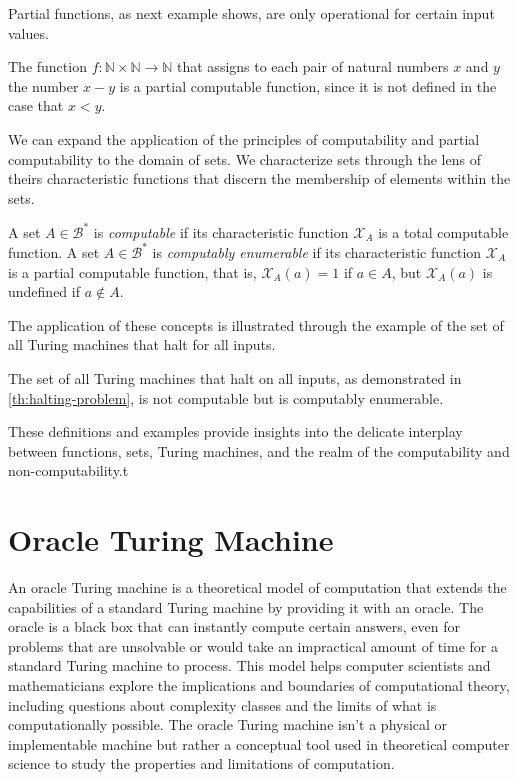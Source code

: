 Partial functions, as next example shows, are only operational for certain input values. 

\begin{example}
The function $f: \mathbb{N} \times \mathbb{N} \rightarrow \mathbb{N}$ that assigns to each pair of natural numbers $x$ and $y$ the number $x - y$ is a partial computable function, since it is not defined in the case that $x < y$.
\end{example}

We can expand the application of the principles of computability and partial computability to the domain of sets. We characterize sets through the lens of theirs characteristic functions that discern the membership of elements within the sets.

\begin{definition}
A set $A \in \mathcal{B}^\ast$ is \emph{computable} if its characteristic function $\mathcal{X}_A$ is a total computable function. A set $A \in \mathcal{B}^\ast$ is \emph{computably enumerable} if its characteristic function $\mathcal{X}_A$ is a partial computable function, that is, $\mathcal{X}_A(a) = 1$ if $a \in A$, but $\mathcal{X}_A(a)$ is undefined if $a \not\in A$.
\end{definition}

The application of these concepts is illustrated through the example of the set of all Turing machines that halt for all inputs.

\begin{example}
The set of all Turing machines that halt on all inputs, as demonstrated in \ref{th:halting-problem}, is not computable but is computably enumerable.
\end{example}

These definitions and examples provide insights into the delicate interplay between functions, sets, Turing machines, and the realm of the computability and non-computability.t

%
%

\section{Oracle Turing Machine}
\label{sec:oracle_turing_machine}

An oracle Turing machine is a theoretical model of computation that extends the capabilities of a standard Turing machine by providing it with an oracle. The oracle is a black box that can instantly compute certain answers, even for problems that are unsolvable or would take an impractical amount of time for a standard Turing machine to process. This model helps computer scientists and mathematicians explore the implications and boundaries of computational theory, including questions about complexity classes and the limits of what is computationally possible. The oracle Turing machine isn't a physical or implementable machine but rather a conceptual tool used in theoretical computer science to study the properties and limitations of computation.

